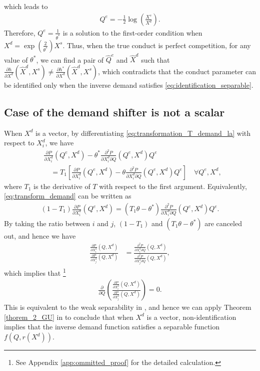 \documentclass[11pt, a4paper]{article}
\theoremstyle{remark}
\begin{document}
which leads to
\begin{align}
    Q^e = -\frac{1}{2} \log\left(\frac{X^{s}}{X^{d}}\right).
\end{align}
Therefore, $Q^e = \frac{1}{\theta^{*}}$ is a solution to the first-order condition when $X^{d} = \exp\left(\frac{2}{\theta^{*}}\right)X^{s}$.
Thus, when the true conduct is perfect competition, for any value of $\theta^*$, we can find a pair of $\hat{Q}^e$ and $\hat{X}^{d}$ such that $\frac{\partial h}{\partial X^{d}}(\hat{X}^{d}, X^{s}) \ne \frac{\partial h^{*}}{\partial X^{d}}(\hat{X}^{d}, X^{s})$, which contradicts that the conduct parameter can be identified only when the inverse demand satisfies \eqref{eq:identification_separable}.

\subsection{Case of the demand shifter is not a scalar}\label{sec:case_x_d_not_scalar}
When $X^{d}$ is a vector, by differentiating \eqref{eq:transformation_T_demand_la} with respect to $X_{i}^{d}$, we have
\begin{align}
    &\frac{\partial P}{\partial X^{d}_{i}}(Q^e, X^{d}) -\theta^{*} \frac{\partial^2 P}{\partial X^{d}_{i}\partial Q}(Q^e, X^{d})Q^e\\
    & \quad = T_1\left[\frac{\partial P}{\partial X^{d}_{i}}(Q^e, X^{d}) - \theta\frac{\partial^2 P}{\partial X^{d}_{i}\partial Q}(Q^e, X^{d})Q^e\right] \quad \forall Q^e, X^{d}, \label{eq:transform_demand}
\end{align}
where $T_1$ is the derivative of $T$ with respect to the first argument.
Equivalently, \eqref{eq:transform_demand} can be written as
\begin{align}
    (1 -  T_1)\frac{\partial P}{\partial X^{d}_{i}}(Q^e, X^{d}) = ( T_1\theta  - \theta^*)\frac{\partial^2 P}{\partial X^{d}_{i}\partial Q}(Q^e, X^{d})Q^e.
\end{align}
By taking the ratio between $i$ and $j$, $(1 - T_1)$ and  $(T_1\theta - \theta^{*})$ are canceled out, and hence we have
\begin{align}
    \frac{\frac{\partial P}{\partial X^{d}_{i}}(Q, X^{d})}{\frac{\partial P}{\partial X^{d}_{j}}(Q, X^{d})} & = \frac{ \frac{\partial^2 P}{\partial X^{d}_{i} \partial Q}(Q, X^{d})}{\frac{\partial^2 P}{\partial X^{d}_{j} \partial Q}(Q, X^{d})}, 
\end{align}
which implies that \footnote{See Appendix \ref{app:ommitted_proof} for the detailed calculation.}
\begin{align}
    \frac{\partial}{\partial Q} \left(\frac{\frac{\partial P}{\partial X^{d}_{i}}(Q, X^{d})}{\frac{\partial P}{\partial X^{d}_{j}}(Q, X^{d})}\right) = 0.
\end{align}
This is equivalent to the weak separability in \citet{goldmanNote1964}, and hence we can apply Theorem \ref{thorem_2_GU} in \citet{goldmanNote1964} to conclude that when $X^{d}$ is a vector, non-identification implies that the inverse demand function satisfies a separable function $f(Q, r(X^{d}))$.
\end{document}
